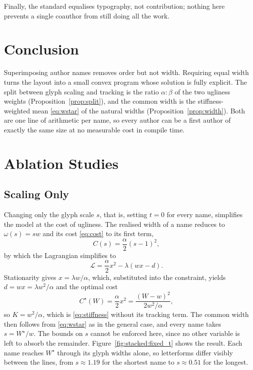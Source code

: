 \documentclass[10pt,twocolumn]{article}
\theoremstyle{plain}
\theoremstyle{definition}
\begin{document}
  Finally, the standard equalises typography, not contribution; nothing here prevents a single coauthor from still doing all the work.

  \section{Conclusion}
  Superimposing author names removes order but not width.
  Requiring equal width turns the layout into a small convex program whose solution is fully explicit.
  The split between glyph scaling and tracking is the ratio $\alpha : \beta$ of the two ugliness weights (Proposition~\ref{prop:split}), and the common width is the stiffness-weighted mean \eqref{eq:wstar} of the natural widths (Proposition~\ref{prop:width}).
  Both are one line of arithmetic per name, so every author can be a first author of exactly the same size at no measurable cost in compile time.

  \printbibliography

  \appendix
  \section{Ablation Studies}
  \label{sec:ablation}
  \subsection{Scaling Only}
  Changing only the glyph scale $s$, that is, setting $t = 0$ for every name, simplifies the model at the cost of ugliness.
  The realised width of a name reduces to $\omega(s) = s w$ and its cost \eqref{eq:cost} to its first term,
  \[
    C(s) = \frac{\alpha}{2} (s-1)^2,
  \]
  by which the Lagrangian simplifies to
  \[
    \mathcal{L} = \frac{\alpha}{2} x^2 - \lambda (w x - d).
  \]
  Stationarity gives $x = \lambda w / \alpha$, which, substituted into the constraint, yields $d = w x = \lambda w^2 / \alpha$ and the optimal cost
  \[
    C^\star(W) = \frac{\alpha}{2} x^2 = \frac{(W-w)^2}{2 w^2 / \alpha},
  \]
  so $K = w^2/\alpha$, which is \eqref{eq:stiffness} without its tracking term.
  The common width then follows from \eqref{eq:wstar} as in the general case, and every name takes $s = W^\star / w$.
  The bounds on $s$ cannot be enforced here, since no other variable is left to absorb the remainder.
  Figure~\ref{fig:stacked:fixed_t} shows the result.
  Each name reaches $W^\star$ through its glyph widths alone, so letterforms differ visibly between the lines, from $s \approx 1.19$ for the shortest name to $s \approx 0.51$ for the longest.
\end{document}
